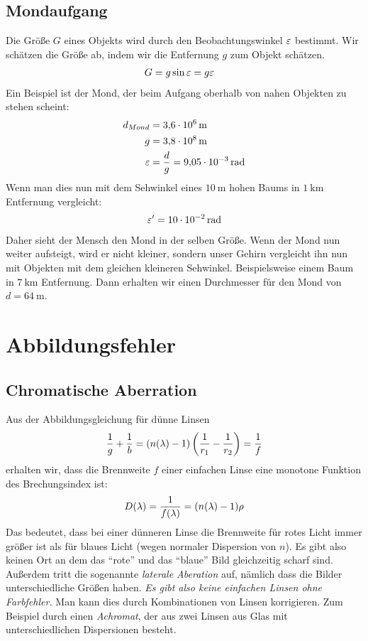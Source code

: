 \subsection{Mondaufgang}
Die Größe $G$ eines Objekts wird durch den Beobachtungswinkel $\varepsilon$ bestimmt.
Wir schätzen die Größe ab, indem wir die Entfernung $g$ zum Objekt schätzen.
\begin{align*}
	G &= g\sin\varepsilon=g\varepsilon
\end{align*}
Ein Beispiel ist der Mond, der beim Aufgang oberhalb von nahen Objekten zu
stehen scheint:
\begin{align*}
	d_{Mond} &= \SI{3,6e6}{\meter}\\
	g &= \SI{3,8e8}{\meter}\\
	\varepsilon &= \frac{d}{g}=\SI{9,05e-3}{\radian}
\end{align*}
Wenn man dies nun mit dem Sehwinkel eines $\SI{10}{\meter}$ hohen
Baums in $\SI{1}{\kilo\meter}$ Entfernung vergleicht:
\begin{align*}
	\varepsilon^\prime = \SI{10e-2}{\radian}
\end{align*}
Daher sieht der Mensch den Mond in der selben Größe. Wenn der Mond nun
weiter aufsteigt, wird er nicht kleiner, sondern unser Gehirn
vergleicht ihn nun mit Objekten mit dem gleichen kleineren
Sehwinkel. Beispielsweise einem Baum in $\SI{7}{\kilo\meter}$
Entfernung. Dann erhalten wir einen Durchmesser für den Mond von
$d=\SI{64}{\meter}$.

\section{Abbildungsfehler}
\subsection{Chromatische Aberration}
Aus der Abbildungsgleichung für dünne Linsen
\begin{align*}
  \frac{1}{g} + \frac{1}{b}
  = (n(\lambda)-1) \left( \frac{1}{r_1} - \frac{1}{r_2} \right)
  = \frac{1}{f}
\end{align*}
erhalten wir, dass die Brennweite $f$ einer einfachen Linse eine
monotone Funktion des Brechungsindex ist:
\begin{align*}
  D(\lambda) 
  = \frac{1}{f(\lambda)}
  = (n(\lambda)-1)\rho
\end{align*}
Das bedeutet, dass bei einer dünneren Linse die Brennweite für rotes
Licht immer größer ist als für blaues Licht (wegen normaler Dispersion
von $n$).
Es gibt also keinen Ort an dem das \enquote{rote} und das
\enquote{blaue} Bild gleichzeitig scharf sind. Außerdem tritt die
sogenannte \emph{laterale Aberation}
auf, nämlich dass die Bilder unterschiedliche Größen haben.
\emph{Es gibt also keine einfachen Linsen ohne Farbfehler.}
Man kann dies durch Kombinationen von Linsen korrigieren. Zum Beispiel
durch einen \emph{Achromat}, der aus zwei Linsen aus Glas mit
unterschiedlichen Dispersionen besteht.


